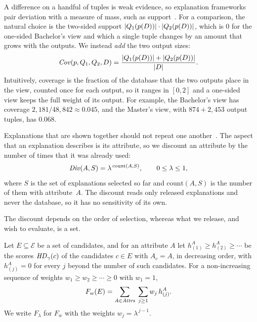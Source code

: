 A difference on a handful of tuples is weak evidence, so explanation frameworks pair deviation with a measure of mass, such as support~\cite{AgrawalIS93,MacroBase,DIFF,Anchors,ExplanationTables}.
For a comparison, the natural choice is the two-sided support $|Q_1(p(D))|\cdot|Q_2(p(D))|$, which is $0$ for the one-sided Bachelor's view and which a single tuple changes by an amount that grows with the outputs.
We instead \emph{add} the two output sizes:
\begin{equation}
\mathit{Cov}(p,Q_1,Q_2,D)=\frac{|Q_1(p(D))|+|Q_2(p(D))|}{|D|}.
\label{eq:coverage-proxy}
\end{equation}
Intuitively, coverage is the fraction of the database that the two outputs place in the view, counted once for each output, so it ranges in $[0,2]$ and a one-sided view keeps the full weight of its output.
For example, the Bachelor's view has coverage $2{,}181/48{,}842\approx0.045$, and the Master's view, with $874+2{,}453$ output tuples, has $0.068$.

Explanations that are shown together should not repeat one another~\cite{MMR,GollapudiS09,LinBilmes11,DrosouP10}.
The aspect that an explanation describes is its attribute, so we discount an attribute by the number of times that it was already used:
\begin{equation}
\mathit{Div}(A,S)=\lambda^{\,\mathrm{count}(A,S)},
\qquad 0\le\lambda\le1,
\label{eq:diversity-score}
\end{equation}
where $S$ is the set of explanations selected so far and $\mathrm{count}(A,S)$ is the number of them with attribute~$A$.
The discount reads only released explanations and never the database, so it has no sensitivity of its own.

The discount depends on the order of selection, whereas what we release, and wish to evaluate, is a set.

\begin{definition}
\label{def:setobj}
Let $E\subseteq\mathcal{E}$ be a set of candidates, and for an attribute $A$ let
$h^A_{(1)}\ge h^A_{(2)}\ge\cdots$ be the scores $\mathit{HD}_\gamma(c)$ of the candidates $c\in E$ with $A_c=A$, in decreasing order, with $h^A_{(j)}=0$ for every $j$ beyond the number of such candidates.
For a non-increasing sequence of weights $w_1\ge w_2\ge\cdots\ge0$ with $w_1=1$,
\begin{equation}
F_w(E)=\sum_{A\in\mathit{Attrs}}\;\sum_{j\ge1} w_j\, h^A_{(j)} .
\label{eq:set-objective}
\end{equation}
We write $F_\lambda$ for $F_w$ with the weights $w_j=\lambda^{\,j-1}$.
\end{definition}

